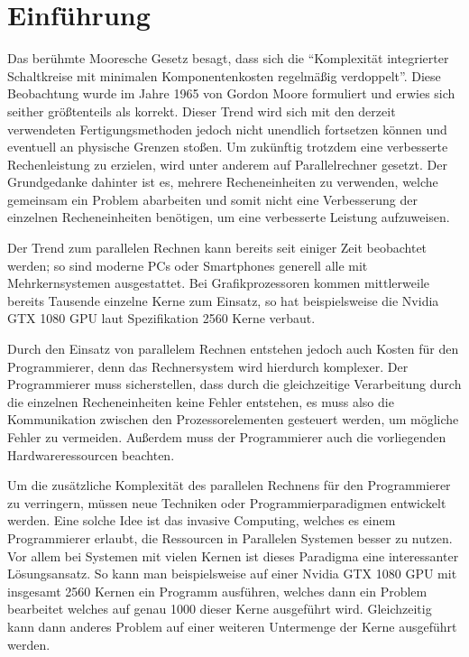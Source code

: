 \chapter{Einführung}\label{sec:intro}

Das berühmte Mooresche Gesetz besagt, dass sich die 
"`Komplexität integrierter Schaltkreise mit minimalen Komponentenkosten regelmäßig verdoppelt"'\cite{mooresLawWikiDe}.
Diese Beobachtung wurde im Jahre 1965 von Gordon Moore formuliert und erwies sich seither größtenteils als
korrekt\cite{mooresLawWikiDe}.
Dieser Trend wird sich mit den derzeit verwendeten Fertigungsmethoden jedoch nicht unendlich fortsetzen können und eventuell an
physische Grenzen stoßen. Um zukünftig trotzdem eine verbesserte Rechenleistung zu erzielen, wird unter anderem auf
Parallelrechner gesetzt. Der Grundgedanke dahinter ist es, mehrere Recheneinheiten zu verwenden, welche gemeinsam ein Problem
abarbeiten und somit nicht eine Verbesserung der einzelnen Recheneinheiten benötigen, um eine verbesserte Leistung aufzuweisen.

Der Trend zum parallelen Rechnen kann bereits seit einiger Zeit beobachtet werden; so sind moderne PCs oder Smartphones
generell alle mit Mehrkernsystemen ausgestattet. Bei Grafikprozessoren kommen mittlerweile bereits Tausende einzelne Kerne
zum Einsatz, so hat beispielsweise die Nvidia GTX 1080 GPU laut Spezifikation \cite{nvidia1080specs} 2560 Kerne verbaut.

Durch den Einsatz von parallelem Rechnen entstehen jedoch auch Kosten für den Programmierer, denn das Rechnersystem wird
hierdurch komplexer. Der Programmierer muss sicherstellen, dass durch die gleichzeitige Verarbeitung durch die einzelnen
Recheneinheiten keine Fehler entstehen, es muss also die Kommunikation zwischen den Prozessorelementen gesteuert werden, um mögliche
Fehler zu vermeiden. Außerdem muss der Programmierer auch die vorliegenden Hardwareressourcen beachten.

Um die zusätzliche Komplexität des parallelen Rechnens für den Programmierer zu verringern, müssen neue Techniken oder
Programmierparadigmen entwickelt werden. Eine solche Idee ist das invasive Computing, welches es einem Programmierer
erlaubt, die Ressourcen in Parallelen Systemen besser zu nutzen. Vor allem bei Systemen mit vielen Kernen ist dieses Paradigma
eine interessanter Lösungsansatz. So kann man beispielsweise auf einer Nvidia GTX 1080 GPU mit insgesamt 2560 Kernen ein Programm
ausführen, welches dann ein Problem bearbeitet welches auf genau 1000 dieser Kerne ausgeführt wird. Gleichzeitig kann dann anderes
Problem auf einer weiteren Untermenge der Kerne ausgeführt werden.

